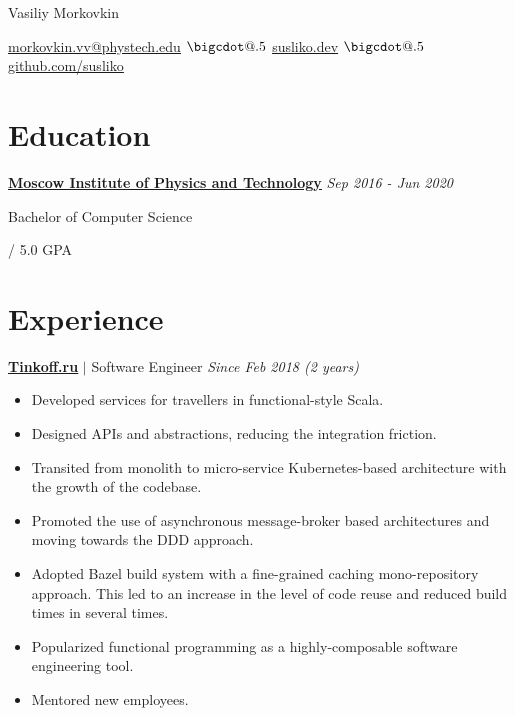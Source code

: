 \documentclass[paper=a4,fontsize=15pt]{scrartcl}
\makeatletter
\newcommand*\bigcdot{\mathpalette\bigcdot@{.5}}
\newcommand*\bigcdot@[2]{\mathbin{\vcenter{\hbox{\scalebox{#2}{$\m@th#1\bullet$}}}}}
\newcommand{\smallspace}{\vspace*{0.1em}}
\newcommand{\quarterspace}{\vspace*{0.25em}}
\newcommand{\halfspace}{\vspace*{0.5em}}
\newcommand{\https}[1]{\href{https://#1}{\ul{#1}}}
\newcommand{\email}[1]{\href{mailto:#1}{\ul{#1}}}
\makeatother
\begin{document}
\begin{center}
  {\fontsize{35}{40}\selectfont Vasiliy Morkovkin \par}
  \halfspace
  \smallspace
  \smallspace

  {\normalsize
    \email{morkovkin.vv@phystech.edu}
    $\bigcdot$ \https{susliko.dev}
    $\bigcdot$ \https{github.com/susliko}
    \par}
\end{center}

\section*{Education}{}
\noindent \href{https://mipt.ru/english/}{\textbf{\ul{Moscow Institute of Physics and Technology}}}
{\hfill \footnotesize \textit{Sep 2016 - Jun 2020}} \par
\noindent Bachelor of Computer Science \par
\quarterspace
\footnotesize
{} / 5.0 GPA

\section*{Experience}{}
\normalsize
\noindent \href{https://www.tinkoff.ru}{\textbf{\ul{Tinkoff.ru}}}
$\vert$ \small Software Engineer
{\hfill \footnotesize \textit{Since Feb 2018 (2 years)}}
\begin{itemize}[noitemsep,leftmargin=20pt,label=\raisebox{0.25ex}{\tiny$\bullet$},topsep=5pt]
  \small
  \item Developed services for travellers in functional-style Scala.
  \item Designed APIs and abstractions, reducing the integration friction.
  \item Transited from monolith to micro-service Kubernetes-based architecture with the growth of the codebase.
  \item Promoted the use of asynchronous message-broker based architectures and moving towards the DDD approach.
  \item Adopted Bazel build system with a fine-grained caching mono-repository approach. This led to an increase in the level of code reuse and reduced build times in several times.
  \item Popularized functional programming as a highly-composable software engineering tool.
  \item Mentored new employees.
\end{itemize}
\end{document}

